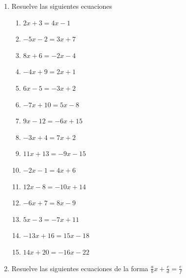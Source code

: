 \documentclass[12pt]{article}
\theoremstyle{plain}
\theoremstyle{definition}
\theoremstyle{remark}
\begin{document}
\begin{enumerate}
\def\labelenumi{\arabic{enumi}.}
\item
  Resuelve las siguientes ecuaciones

  \begin{enumerate}
  \def\labelenumii{\roman{enumii}.}
  \item
    \(2x + 3 = 4x - 1\)
  \item
    \(-5x - 2 = 3x + 7\)
  \item
    \(8x + 6 = -2x - 4\)
  \item
    \(-4x + 9 = 2x + 1\)
  \item
    \(6x - 5 = -3x + 2\)
  \item
    \(-7x + 10 = 5x - 8\)
  \item
    \(9x - 12 = -6x + 15\)
  \item
    \(-3x + 4 = 7x + 2\)
  \item
    \(11x + 13 = -9x - 15\)
  \item
    \(-2x - 1 = 4x + 6\)
  \item
    \(12x - 8 = -10x + 14\)
  \item
    \(-6x + 7 = 8x - 9\)
  \item
    \(5x - 3 = -7x + 11\)
  \item
    \(-13x + 16 = 15x - 18\)
  \item
    \(14x + 20 = -16x - 22\)
  \end{enumerate}
\item
  Resuelve las siguientes ecuaciones de la forma
  \(\frac{a}{b}x+\frac{c}{d}=\frac{e}{f}\)


\end{enumerate}
\end{document}
